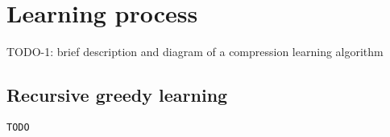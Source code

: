 \section{Learning process}





% 

TODO-1: brief description and diagram of a compression learning algorithm











\subsection{Recursive greedy learning}
\label{sub:learning:recursivegreedy}

\begin{verbatim}
TODO
\end{verbatim}

\iffalse
TODO-1-1: result: worse than iterative learning since it misses multi-column opportunities
TODO-1-2: advantage: faster execution (one column at a time; suitable for columnar storage)
TODO-2: comparison with the other algorithms & improvements brought to OR by them
\fi



